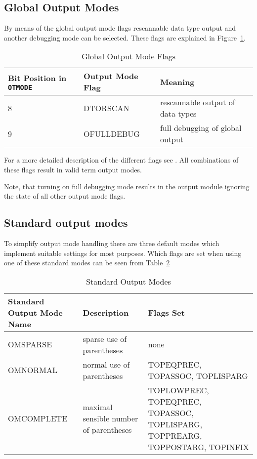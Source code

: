 \subsection{Global Output Modes}
By means of the global output mode flags rescannable data type output
and another debugging mode can be selected. 
These flags are explained in Figure~\ref{gomodes}.

\begin{table}[htbp]
\begin{center}
\begin{tabular}{|p{0.8in}|l|p{2.5in}|}
\hline
Bit Position in {\tt OTMODE} & Output Mode Flag & Meaning \\
\hline \hline
8 & DTORSCAN & rescannable output of data types \\ \hline
9 & OFULLDEBUG & full debugging of global output \\ \hline
\end{tabular}
\end{center}
\caption{Global Output Mode Flags}
\label{gomodes}
\end{table}

For a more detailed description of the different flags see \NPUG.
All combinations of these flags result in valid term output modes.

Note, that turning on full debugging mode results in the output module
ignoring the state of all other output mode flags.

\subsection{Standard output modes}

To simplify output mode handling there are three default modes
which implement suitable settings for most purposes. Which flags
are set when using one of these standard modes can be seen from
Table~\ref{standardom}

\begin{table}[htbp]
\begin{center}
\begin{tabular}{|p{1.5in}|p{1.5in}|p{2in}|}
\hline
Standard Output Mode Name & Description & Flags Set \\
\hline \hline
OMSPARSE & sparse use of parentheses & none \\ \hline
OMNORMAL & normal use of parentheses & TOPEQPREC, TOPASSOC, TOPLISPARG \\
   \hline
OMCOMPLETE & maximal sensible number of parentheses &
   TOPLOWPREC, \newline TOPEQPREC, TOPASSOC, TOPLISPARG, TOPPREARG, TOPPOSTARG,
   TOPINFIX \\ \hline
\end{tabular}
\end{center}
\caption{Standard Output Modes}
\label{standardom}
\end{table}

